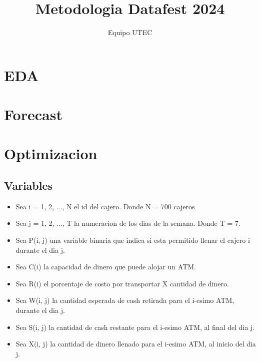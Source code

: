 \documentclass{article}
\begin{document}
\title{Metodologia Datafest 2024}
\author{Equipo UTEC}

\maketitle

\tableofcontents

\section{EDA}

\section{Forecast}

\section{Optimizacion}

\subsection{Variables}

\begin{itemize}
    \item Sea i = 1, 2, ..., N el id del cajero. Donde N = 700 cajeros
    \item Sea j = 1, 2, ..., T la numeracion de los dias de la semana. Donde T = 7.
    \item Sea P(i, j) una variable binaria que indica si esta permitido llenar el cajero i durante el dia j.
    \item Sea C(i) la capacidad de dinero que puede alojar un ATM.
    \item Sea R(i) el porcentaje de costo por transportar X cantidad de dinero. %
    \item Sea W(i, j) la cantidad esperada de cash retirada para el i-esimo ATM, durante el dia j.
    \item Sea S(i, j) la cantidad de cash restante para el i-esimo ATM, al final del dia j.
    \item Sea X(i, j) la cantidad de dinero llenado para el i-esimo ATM, al inicio del dia j.
\end{itemize}
\end{document}
